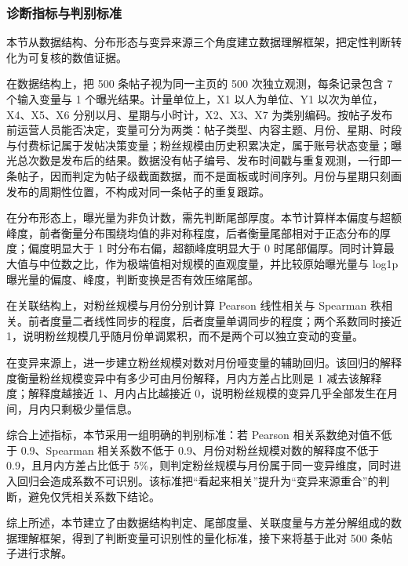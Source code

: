 \subsubsection{诊断指标与判别标准}

本节从数据结构、分布形态与变异来源三个角度建立数据理解框架，把定性判断转化为可复核的数值证据。

在数据结构上，把 500 条帖子视为同一主页的 500 次独立观测，每条记录包含 7 个输入变量与 1 个曝光结果。计量单位上，X1 以人为单位、Y1 以次为单位，X4、X5、X6 分别以月、星期与小时计，X2、X3、X7 为类别编码。按帖子发布前运营人员能否决定，变量可分为两类：帖子类型、内容主题、月份、星期、时段与付费标记属于发帖决策变量；粉丝规模由历史积累决定，属于账号状态变量；曝光总次数是发布后的结果。数据没有帖子编号、发布时间戳与重复观测，一行即一条帖子，因而判定为帖子级截面数据，而不是面板或时间序列。月份与星期只刻画发布的周期性位置，不构成对同一条帖子的重复跟踪。

在分布形态上，曝光量为非负计数，需先判断尾部厚度。本节计算样本偏度与超额峰度，前者衡量分布围绕均值的非对称程度，后者衡量尾部相对于正态分布的厚度；偏度明显大于 1 时分布右偏，超额峰度明显大于 0 时尾部偏厚。同时计算最大值与中位数之比，作为极端值相对规模的直观度量，并比较原始曝光量与 log1p 曝光量的偏度、峰度，判断变换是否有效压缩尾部。

在关联结构上，对粉丝规模与月份分别计算 Pearson 线性相关与 Spearman 秩相关。前者度量二者线性同步的程度，后者度量单调同步的程度；两个系数同时接近 1，说明粉丝规模几乎随月份单调累积，而不是两个可以独立变动的变量。

在变异来源上，进一步建立粉丝规模对数对月份哑变量的辅助回归。该回归的解释度衡量粉丝规模变异中有多少可由月份解释，月内方差占比则是 1 减去该解释度；解释度越接近 1、月内占比越接近 0，说明粉丝规模的变异几乎全部发生在月间，月内只剩极少量信息。

综合上述指标，本节采用一组明确的判别标准：若 Pearson 相关系数绝对值不低于 0.9、Spearman 相关系数不低于 0.9、月份对粉丝规模对数的解释度不低于 0.9，且月内方差占比低于 5\%，则判定粉丝规模与月份属于同一变异维度，同时进入回归会造成系数不可识别。该标准把“看起来相关”提升为“变异来源重合”的判断，避免仅凭相关系数下结论。

综上所述，本节建立了由数据结构判定、尾部度量、关联度量与方差分解组成的数据理解框架，得到了判断变量可识别性的量化标准，接下来将基于此对 500 条帖子进行求解。
